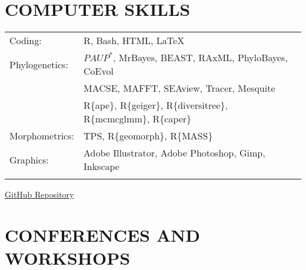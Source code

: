 \documentclass[10pt,a4paper]{article}
\begin{document}
{\section{COMPUTER SKILLS}
\begin{tabular}{ll}
Coding: & R, Bash, HTML, LaTeX\\[1.5ex]
Phylogenetics: & $PAUP^{*}$, MrBayes, BEAST, RAxML, PhyloBayes, CoEvol \\[1.5ex]
& MACSE, MAFFT, SEAview, Tracer, Mesquite\\
& R\{ape\}, R\{geiger\}, R\{diversitree\}, R\{mcmcglmm\}, R\{caper\} \\[1.5ex]
Morphometrics: & TPS, R\{geomorph\}, R\{MASS\} \\[1.5ex]
Graphics: & Adobe Illustrator, Adobe Photoshop, Gimp, Inkscape\\[1.5ex]
& \\
\end{tabular}
\href{https://github.com/TGuillerme?tab=repositories}{GitHub Repository}
\bigskip


\section{CONFERENCES AND WORKSHOPS}

}
\end{document}
